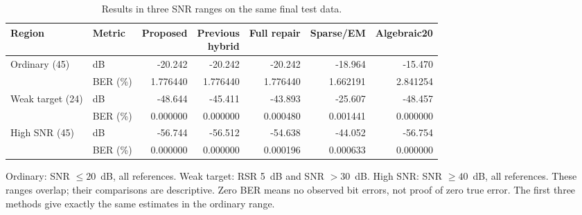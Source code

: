 \begin{table}[!t]
\centering
\caption{Results in three SNR ranges on the same final test data.}
\label{tab:reliability-regions}
\small
\setlength{\tabcolsep}{4pt}
\begin{tabular}{llrrrrr}
\toprule
Region & Metric & Proposed & \shortstack{Previous\\hybrid} & Full repair & Sparse/EM & Algebraic20 \\
\midrule
Ordinary (45) & dB & -20.242 & -20.242 & -20.242 & -18.964 & -15.470 \\
 & BER (\%) & 1.776440 & 1.776440 & 1.776440 & 1.662191 & 2.841254 \\
Weak target (24) & dB & -48.644 & -45.411 & -43.893 & -25.607 & -48.457 \\
 & BER (\%) & 0.000000 & 0.000000 & 0.000480 & 0.001441 & 0.000000 \\
High SNR (45) & dB & -56.744 & -56.512 & -54.638 & -44.052 & -56.754 \\
 & BER (\%) & 0.000000 & 0.000000 & 0.000196 & 0.000633 & 0.000000 \\
\bottomrule
\end{tabular}
\par\vspace{2pt}
\begin{minipage}{0.98\textwidth}\footnotesize Ordinary: SNR $\leq20$~dB, all references. Weak target: RSR 5~dB and SNR $>30$~dB. High SNR: SNR $\geq40$~dB, all references. These ranges overlap; their comparisons are descriptive. Zero BER means no observed bit errors, not proof of zero true error. The first three methods give exactly the same estimates in the ordinary range.\end{minipage}
\end{table}
